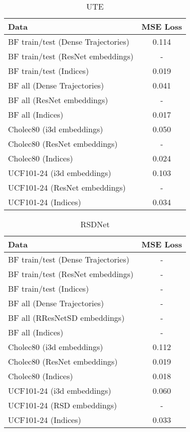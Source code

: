 \documentclass[10pt,twocolumn,letterpaper]{article}
\begin{document}
\begin{table}
   \centering
   \begin{tabular}{@{}lc@{}}
     \toprule
     Data & MSE Loss \\
     \midrule
     BF train/test (Dense Trajectories) & 0.114 \\
     BF train/test (ResNet embeddings) & - \\
     BF train/test (Indices) & 0.019 \\

     BF all (Dense Trajectories) & 0.041 \\
     BF all (ResNet embeddings) & - \\
     BF all (Indices) & 0.017 \\

     \midrule
     Cholec80 (i3d embeddings) & 0.050 \\
     Cholec80 (ResNet embeddings) & - \\
     Cholec80 (Indices) & 0.024 \\

     \midrule
     UCF101-24 (i3d embeddings) & 0.103 \\
     UCF101-24 (ResNet embeddings) & - \\
     UCF101-24 (Indices) & 0.034\\

     \bottomrule
   \end{tabular}
   \caption{UTE}
   \label{tab:ute}
 \end{table}

 \begin{table}
   \centering
   \begin{tabular}{@{}lc@{}}
     \toprule
     Data & MSE Loss \\
     \midrule
     BF train/test (Dense Trajectories) & - \\
     BF train/test (ResNet embeddings) & - \\
     BF train/test (Indices) & - \\

     BF all (Dense Trajectories) & - \\
     BF all (RResNetSD embeddings) & - \\
     BF all (Indices) & - \\

     \midrule
     Cholec80 (i3d embeddings) & 0.112 \\
     Cholec80 (ResNet embeddings) & 0.019 \\
     Cholec80 (Indices) & 0.018 \\

     \midrule
     UCF101-24 (i3d embeddings) & 0.060 \\
     UCF101-24 (RSD embeddings) & -\\
     UCF101-24 (Indices) & 0.033 \\

     \bottomrule
   \end{tabular}
   \caption{RSDNet}
   \label{tab:rsdnet}
 \end{table}
\end{document}

